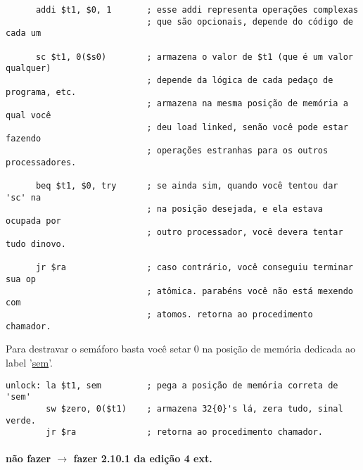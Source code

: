 \documentclass{article}
\begin{document}
\begin{enumerate}
\begin{verbatim}
      addi $t1, $0, 1       ; esse addi representa operações complexas
                            ; que são opcionais, depende do código de cada um

      sc $t1, 0($s0)        ; armazena o valor de $t1 (que é um valor qualquer)
                            ; depende da lógica de cada pedaço de programa, etc.
                            ; armazena na mesma posição de memória a qual você
                            ; deu load linked, senão você pode estar fazendo
                            ; operações estranhas para os outros processadores.

      beq $t1, $0, try      ; se ainda sim, quando você tentou dar 'sc' na
                            ; na posição desejada, e ela estava ocupada por
                            ; outro processador, você devera tentar tudo dinovo.

      jr $ra                ; caso contrário, você conseguiu terminar sua op
                            ; atômica. parabéns você não está mexendo com
                            ; atomos. retorna ao procedimento chamador.
\end{verbatim}

Para destravar o semáforo basta você setar 0 na posição de memória dedicada ao 
label '\underline{sem}'.

\begin{verbatim}
unlock: la $t1, sem         ; pega a posição de memória correta de 'sem'
        sw $zero, 0($t1)    ; armazena 32{0}'s lá, zera tudo, sinal verde.
        jr $ra              ; retorna ao procedimento chamador.
\end{verbatim}

\end{enumerate}

\paragraph{não fazer  $\rightarrow$ fazer 2.10.1 da edição 4 ext.}
\end{document}
